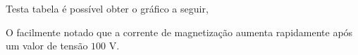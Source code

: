 \documentclass[conference]{IEEEtran}
\begin{document}
Testa tabela é possível obter o gráfico a seguir,

O facilmente notado que a corrente de magnetização aumenta rapidamente
após um valor de tensão $100$ V.


%
%



%
%
\end{document}
